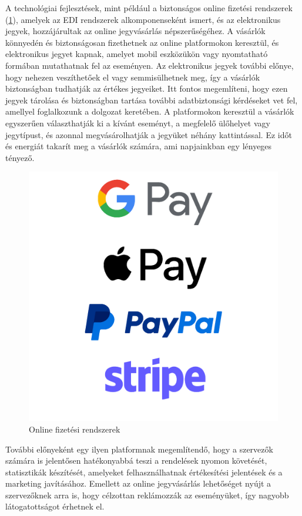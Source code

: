 A technológiai fejlesztések, mint például a biztonságos online fizetési rendszerek (\ref{abra:Logok}), amelyek az EDI rendszerek alkomponenseként ismert, és az elektronikus jegyek, hozzájárultak az online jegyvásárlás népszerűségéhez. A vásárlók könnyedén és biztonságosan fizethetnek az online platformokon keresztül, és elektronikus jegyet kapnak, amelyet mobil eszközükön vagy nyomtatható formában mutathatnak fel az eseményen. Az elektronikus jegyek további előnye, hogy nehezen veszíthetőek el vagy semmisülhetnek meg, így a vásárlók biztonságban tudhatják az értékes jegyeiket. Itt fontos megemlíteni, hogy ezen jegyek tárolása és biztonságban tartása további adatbiztonsági kérdéseket vet fel, amellyel foglalkozunk a dolgozat keretében. A platformokon keresztül a vásárlók egyszerűen választhatják ki a kívánt eseményt, a megfelelő ülőhelyet vagy jegytípust, és azonnal megvásárolhatják a jegyüket néhány kattintással. Ez időt és energiát takarít meg a vásárlók számára, ami napjainkban egy lényeges tényező.

\begin{figure}[!h]
	\centering
	\includegraphics[scale=0.2]{images/logok}
	\caption{Online fizetési rendszerek}
	\label{abra:Logok}
\end{figure}
\pagebreak

További előnyeként egy ilyen platformnak megemlítendő, hogy a szervezők számára is jelentősen hatékonyabbá teszi a rendelések nyomon követését, statisztikák készítését, amelyeket felhasználhatnak értékesítési jelentések és a marketing javításához. Emellett az online jegyvásárlás lehetőséget nyújt a szervezőknek arra is, hogy célzottan reklámozzák az eseményüket, így nagyobb látogatottságot érhetnek el.

